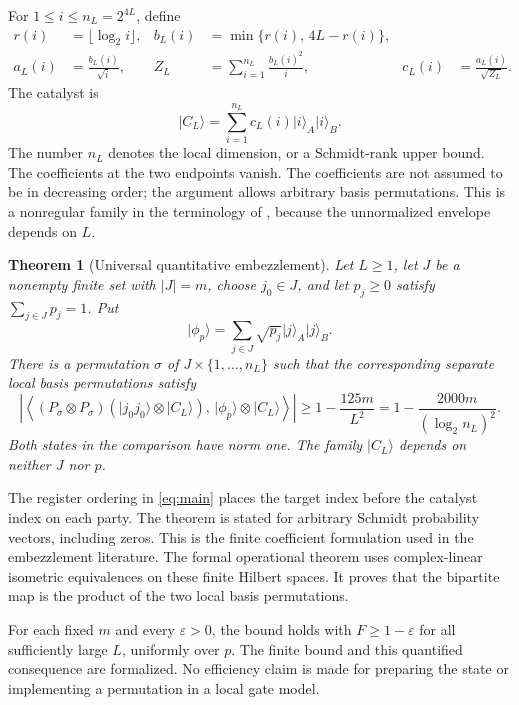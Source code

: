 \documentclass[11pt]{article}
\newtheorem{theorem}{Theorem}
\newcommand{\ket}[1]{\lvert #1\rangle}
\begin{document}
For $1\leq i\leq n_L=2^{4L}$, define
\begin{align}
 r(i)&=\lfloor\log_2 i\rfloor, &
 b_L(i)&=\min\{r(i),\,4L-r(i)\},\\
 a_L(i)&=\frac{b_L(i)}{\sqrt i}, &
 Z_L&=\sum_{i=1}^{n_L}\frac{b_L(i)^2}{i}, &
 c_L(i)&=\frac{a_L(i)}{\sqrt{Z_L}}.\label{eq:construction}
\end{align}
The catalyst is
\[
 \ket{C_L}=\sum_{i=1}^{n_L}c_L(i)\ket{i}_A\ket{i}_B.
\]
The number $n_L$ denotes the local dimension, or a Schmidt-rank upper bound. The coefficients at the two endpoints vanish. The coefficients are not assumed to be in decreasing order; the argument allows arbitrary basis permutations. This is a nonregular family in the terminology of \cite{lw}, because the unnormalized envelope depends on $L$.

\begin{theorem}[Universal quantitative embezzlement]\label{thm:main}
Let $L\geq1$, let $J$ be a nonempty finite set with $|J|=m$, choose $j_0\in J$, and let $p_j\geq0$ satisfy $\sum_{j\in J}p_j=1$. Put
\[
 \ket{\phi_p}=\sum_{j\in J}\sqrt{p_j}\ket{j}_A\ket{j}_B.
\]
There is a permutation $\sigma$ of $J\times\{1,\ldots,n_L\}$ such that the corresponding separate local basis permutations satisfy
\begin{equation}
 \left|\left\langle
 (P_\sigma\otimes P_\sigma)
 (\ket{j_0j_0}\otimes\ket{C_L}),\,
 \ket{\phi_p}\otimes\ket{C_L}
 \right\rangle\right|
 \geq 1-\frac{125m}{L^2}
 =1-\frac{2000m}{(\log_2 n_L)^2}.
 \label{eq:main}
\end{equation}
Both states in the comparison have norm one. The family $\ket{C_L}$ depends on neither $J$ nor $p$.
\end{theorem}

The register ordering in \eqref{eq:main} places the target index before the catalyst index on each party. The theorem is stated for arbitrary Schmidt probability vectors, including zeros. This is the finite coefficient formulation used in the embezzlement literature. The formal operational theorem uses complex-linear isometric equivalences on these finite Hilbert spaces. It proves that the bipartite map is the product of the two local basis permutations.

For each fixed $m$ and every $\varepsilon>0$, the bound holds with $F\geq1-\varepsilon$ for all sufficiently large $L$, uniformly over $p$. The finite bound and this quantified consequence are formalized. No efficiency claim is made for preparing the state or implementing a permutation in a local gate model.
\end{document}
